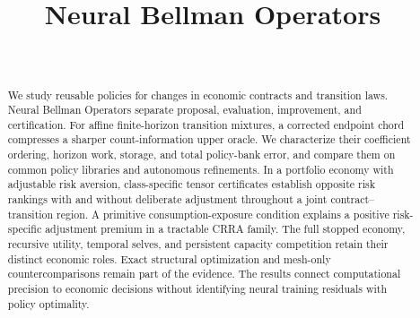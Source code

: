 \documentclass[ecta]{econsocart}
\begin{document}
\begin{frontmatter}
\title{Neural Bellman Operators}
\begin{aug}
\author[id=au1,addressref={add1}]{~}
\address[id=add1]{,}
\end{aug}
\begin{abstract}
We study reusable policies for changes in economic contracts and transition laws. Neural Bellman Operators separate proposal, evaluation, improvement, and certification. For affine finite-horizon transition mixtures, a corrected endpoint chord compresses a sharper count-information upper oracle. We characterize their coefficient ordering, horizon work, storage, and total policy-bank error, and compare them on common policy libraries and autonomous refinements. In a portfolio economy with adjustable risk aversion, class-specific tensor certificates establish opposite risk rankings with and without deliberate adjustment throughout a joint contract--transition region. A primitive consumption-exposure condition explains a positive risk-specific adjustment premium in a tractable CRRA family. The full stopped economy, recursive utility, temporal selves, and persistent capacity competition retain their distinct economic roles. Exact structural optimization and mesh-only countercomparisons remain part of the evidence. The results connect computational precision to economic decisions without identifying neural training residuals with policy optimality.
\end{abstract}
\begin{keyword}
\end{keyword}
\end{frontmatter}















\end{document}
